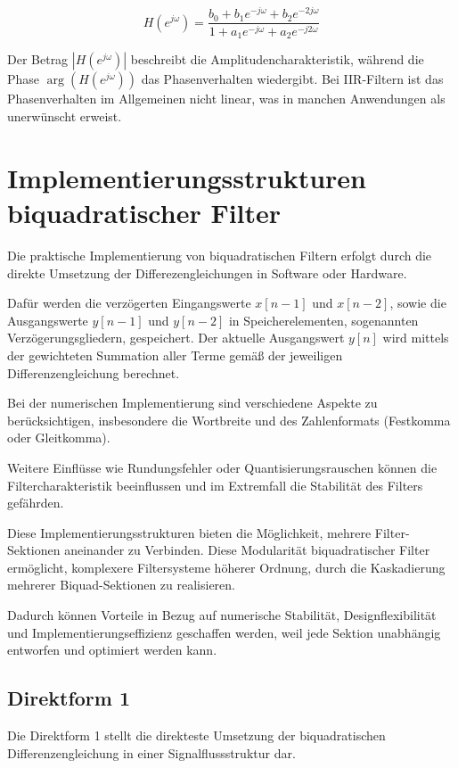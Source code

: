 \documentclass[
  ngerman,
  letterpaper,
  DIV=11]{scrreprt}
\begin{document}
\[
H(e^{j\omega}) = \frac{b_0 + b_1 e^{-j\omega} + b_2 e^{-2j\omega}}{1 + a_1 e^{-j\omega} + a_2 e^{-j2\omega}}
\]

Der Betrag \(|H(e^{j\omega})|\) beschreibt die Amplitudencharakteristik,
während die Phase \(\arg(H(e^{j\omega}))\) das Phasenverhalten
wiedergibt. Bei IIR-Filtern ist das Phasenverhalten im Allgemeinen nicht
linear, was in manchen Anwendungen als unerwünscht erweist.

\chapter{Implementierungsstrukturen biquadratischer
Filter}\label{implementierungsstrukturen-biquadratischer-filter}

Die praktische Implementierung von biquadratischen Filtern erfolgt durch
die direkte Umsetzung der Differezengleichungen in Software oder
Hardware.

Dafür werden die verzögerten Eingangswerte \(x[n-1]\) und \(x[n-2]\),
sowie die Ausgangswerte \(y[n-1]\) und \(y[n-2]\) in Speicherelementen,
sogenannten Verzögerungsgliedern, gespeichert. Der aktuelle Ausgangswert
\(y[n]\) wird mittels der gewichteten Summation aller Terme gemäß der
jeweiligen Differenzengleichung berechnet.

Bei der numerischen Implementierung sind verschiedene Aspekte zu
berücksichtigen, insbesondere die Wortbreite und des Zahlenformats
(Festkomma oder Gleitkomma).

Weitere Einflüsse wie Rundungsfehler oder Quantisierungsrauschen können
die Filtercharakteristik beeinflussen und im Extremfall die Stabilität
des Filters gefährden.

Diese Implementierungsstrukturen bieten die Möglichkeit, mehrere
Filter-Sektionen aneinander zu Verbinden. Diese Modularität
biquadratischer Filter ermöglicht, komplexere Filtersysteme höherer
Ordnung, durch die Kaskadierung mehrerer Biquad-Sektionen zu
realisieren.

Dadurch können Vorteile in Bezug auf numerische Stabilität,
Designflexibilität und Implementierungseffizienz geschaffen werden, weil
jede Sektion unabhängig entworfen und optimiert werden kann.

\section{Direktform 1}\label{direktform-1}

Die Direktform 1 stellt die direkteste Umsetzung der biquadratischen
Differenzengleichung in einer Signalflussstruktur dar.
\end{document}
